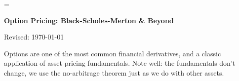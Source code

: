 \documentclass[11pt]{article}
\begin{document}
\parskip=\bigskipamount
\parindent=0.0in
\thispagestyle{empty}


\bigskip\bigskip
\centerline{\Large \bf Option Pricing: Black-Scholes-Merton \& Beyond}
\centerline{Revised: \today}

\begin{comment}
* Figure out graphs v underlying future value and v strike k

*** Focus on how we explain smile *** \\
*** Also use discrete grid approx method ** \\
Outline:  fact, explanation
\end{comment}

\bigskip
Options are one of the most common financial derivatives, and
a classic application of asset pricing fundamentals.
Note well:  the fundamentals don't change, we use the no-arbitrage theorem
just as we do with other assets.
\end{document}
